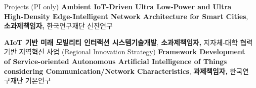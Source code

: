 \begin{rubric}{Projects (PI only)}
%
%
\entry*[2026 -- 2028] \textbf{Ambient IoT-Driven Ultra Low-Power and Ultra High-Density Edge-Intelligent Network Architecture for Smart Cities}, \newline \textbf{소과제책임자,} 한국연구재단 신진연구

\entry*[2021 -- 2024] \textbf{AIoT 기반 미래 모빌리티 인터랙션 시스템기술개발}, \newline \textbf{소과제책임자,} 지자체-대학 협력기반 지역혁신 사업 (Regional Innovation Strategy)
%
\entry*[2022 -- 2023] \textbf{Framework Development of Service-oriented Autonomous Artificial Intelligence of Things considering Communication/Network Characteristics}, \newline \textbf{과제책임자,} 한국연구재단 기본연구
%


\end{rubric}